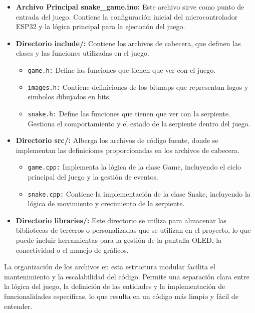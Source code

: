 \begin{itemize}
    \item \textbf{Archivo Principal snake\_game.ino:} Este archivo sirve como punto de entrada del juego. Contiene la configuración inicial del microcontrolador ESP32 y la lógica principal para la ejecución del juego.
    
    \item \textbf{Directorio include/:} Contiene los archivos de cabecera, que definen las clases y las funciones utilizadas en el juego.
    \begin{itemize}
        \item \texttt{game.h:} Define las funciones que tienen que ver con el juego.
        \item \texttt{images.h:} Contiene definiciones de los bitmaps que representan logos y simbolos dibujados en bits.
        \item \texttt{snake.h:} Define las funciones que tienen que ver con la serpiente. Gestiona el comportamiento y el estado de la serpiente dentro del juego.
    \end{itemize}
    
    \item \textbf{Directorio src/:} Alberga los archivos de código fuente, donde se implementan las definiciones proporcionadas en los archivos de cabecera.
    \begin{itemize}
        \item \texttt{game.cpp:} Implementa la lógica de la clase Game, incluyendo el ciclo principal del juego y la gestión de eventos.
        \item \texttt{snake.cpp:} Contiene la implementación de la clase Snake, incluyendo la lógica de movimiento y crecimiento de la serpiente.
    \end{itemize}
    
    \item \textbf{Directorio libraries/:} Este directorio se utiliza para almacenar las bibliotecas de terceros o personalizadas que se utilizan en el proyecto, lo que puede incluir herramientas para la gestión de la pantalla OLED, la conectividad o el manejo de gráficos.
\end{itemize}

La organización de los archivos en esta estructura modular facilita el mantenimiento y la escalabilidad del código. Permite una separación clara entre la lógica del juego, la definición de las entidades y la implementación de funcionalidades específicas, lo que resulta en un código más limpio y fácil de entender.


